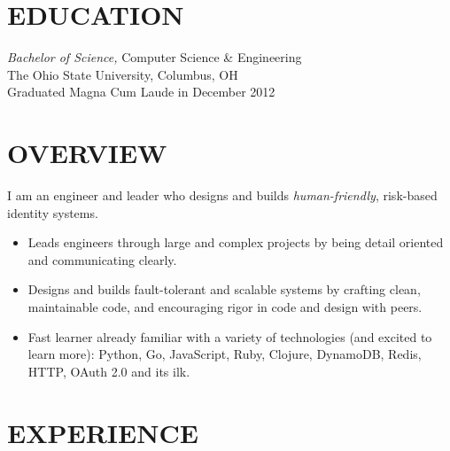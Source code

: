 \documentclass[line,letterpaper]{resume}
\begin{document}
\address{\href{https://www.ryanmcg.com}{Personal website --- https://www.ryanmcg.com}}
\address{\href{mailto:ryan@ryanmcg.com}{ryan@ryanmcg.com}}


\begin{resume}
    \vspace{-24pt}
    \section{\uppercase{Education}} {\sl Bachelor of Science,} \/
    Computer Science \& Engineering \\
    The Ohio State University, Columbus, OH \\
    Graduated Magna Cum Laude in December 2012 \\

    \vspace{-20pt}

    \section{\uppercase{Overview}}
    I am an engineer and leader who designs and builds \emph{human-friendly}, risk-based identity systems.
    \vspace{6pt}
    \begin{itemize}
        \item Leads engineers through large and complex projects by being detail oriented and communicating clearly.
        \item Designs and builds fault-tolerant and scalable systems by crafting
            clean, maintainable code, and encouraging rigor in code and design
            with peers.
        \item Fast learner already familiar with a variety of technologies (and
            excited to learn more): Python, Go, JavaScript,
            Ruby, Clojure, DynamoDB, Redis, HTTP, OAuth 2.0 and its ilk.
    \end{itemize}

    \vspace{-6pt}

    \section{\uppercase{Experience}}


\end{resume}
\end{document}

